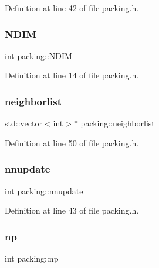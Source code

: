 Definition at line 42 of file packing.\+h.

\mbox{\label{classpacking_a43d0d9d087ec30c847e89b5002e422d4}} 
\subsubsection{\texorpdfstring{N\+D\+IM}{NDIM}}
{\footnotesize\ttfamily int packing\+::\+N\+D\+IM\hspace{0.3cm}{\ttfamily [protected]}}



Definition at line 14 of file packing.\+h.

\mbox{\label{classpacking_a4ef3865ec63508098d2957022fe11b8f}} 
\subsubsection{\texorpdfstring{neighborlist}{neighborlist}}
{\footnotesize\ttfamily std\+::vector$<$int$>$$\ast$ packing\+::neighborlist\hspace{0.3cm}{\ttfamily [protected]}}



Definition at line 50 of file packing.\+h.

\mbox{\label{classpacking_aae18c45219be166f5f1e44ab838f2252}} 
\subsubsection{\texorpdfstring{nnupdate}{nnupdate}}
{\footnotesize\ttfamily int packing\+::nnupdate\hspace{0.3cm}{\ttfamily [protected]}}



Definition at line 43 of file packing.\+h.

\mbox{\label{classpacking_a2e20ad3bfc90e5c328dddd7da34291e1}} 
\subsubsection{\texorpdfstring{np}{np}}
{\footnotesize\ttfamily int packing\+::np\hspace{0.3cm}{\ttfamily [protected]}}



